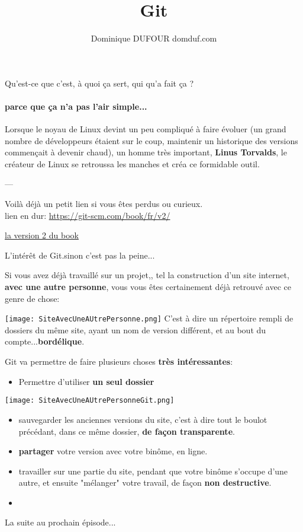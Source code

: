 \documentclass[10pt]{beamer}
\author{Dominique DUFOUR domduf.com}
\title{Git}
\begin{document}
\begin{frame}
\titlepage
\end{frame}

\begin{frame}
\tableofcontents
\end{frame}

\begin{frame}{Qu'est-ce que c'est, à quoi ça sert, qui qu'a fait ça ?}
\framesubtitle{parce que ça n'a pas l'air simple...}

Lorsque le noyau de Linux devint un peu compliqué à faire évoluer (un grand nombre de développeurs étaient sur le coup, maintenir un historique des versions commençait à devenir chaud), un homme très important, \textbf{Linus Torvalds}, le créateur de Linux se retroussa les manches et créa ce formidable outil.

---

Voilà déjà un petit lien si vous êtes perdus ou curieux.
\\
lien en dur: \url{https://git-scm.com/book/fr/v2/}

\href{https://git-scm.com/book/fr/v2/}{la version 2 du book}

\end{frame}



\begin{frame}{L'intérêt de Git.}{sinon c'est pas la peine...}

Si vous avez déjà travaillé sur un projet,, tel la construction d'un site internet, \textbf{avec une autre personne}, vous vous êtes 
certainement déjà retrouvé avec ce genre de chose:

\texttt{[image: SiteAvecUneAUtrePersonne.png]}
C'est à dire un répertoire rempli de dossiers du même site, ayant un nom de version différent, et au bout du compte...\textbf{bordélique}.

\end{frame}



\begin{frame}
Git va permettre de faire plusieurs choses \textbf{très intéressantes}:
\begin{itemize}
\item Permettre d'utiliser \textbf{un seul dossier}
\end{itemize}
\texttt{[image: SiteAvecUneAUtrePersonneGit.png]}

\begin{itemize}
\item sauvegarder les anciennes versions du site, c'est à dire tout le boulot précédant, dans ce même dossier, \textbf{de façon transparente}.
\item \textbf{partager} votre version avec votre binôme, en ligne.
\item travailler sur une partie du site, pendant que votre binôme s'occupe d'une autre, et ensuite "mélanger" votre travail, de façon \textbf{non destructive}.
\item 
\end{itemize}

\end{frame}



\begin{frame}
La suite au prochain épisode...
\end{frame}
\end{document}

